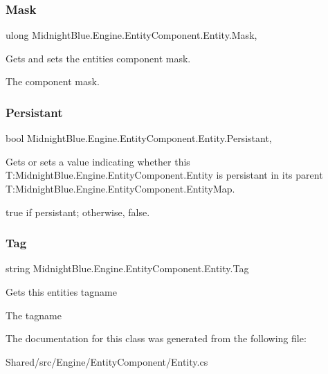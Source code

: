 \subsubsection{\texorpdfstring{Mask}{Mask}}
{\footnotesize\ttfamily ulong Midnight\+Blue.\+Engine.\+Entity\+Component.\+Entity.\+Mask\hspace{0.3cm}{\ttfamily [get]}, {\ttfamily [set]}}



Gets and sets the entities component mask. 

The component mask.\hypertarget{class_midnight_blue_1_1_engine_1_1_entity_component_1_1_entity_af8d42e94328876a35a63032ed12a54c3}{}\label{class_midnight_blue_1_1_engine_1_1_entity_component_1_1_entity_af8d42e94328876a35a63032ed12a54c3} 
\subsubsection{\texorpdfstring{Persistant}{Persistant}}
{\footnotesize\ttfamily bool Midnight\+Blue.\+Engine.\+Entity\+Component.\+Entity.\+Persistant\hspace{0.3cm}{\ttfamily [get]}, {\ttfamily [set]}}



Gets or sets a value indicating whether this T\+:\+Midnight\+Blue.\+Engine.\+Entity\+Component.\+Entity is persistant in its parent T\+:\+Midnight\+Blue.\+Engine.\+Entity\+Component.\+Entity\+Map. 

{\ttfamily true} if persistant; otherwise, {\ttfamily false}.\hypertarget{class_midnight_blue_1_1_engine_1_1_entity_component_1_1_entity_a4743d696644b924c6f74657daf2de89c}{}\label{class_midnight_blue_1_1_engine_1_1_entity_component_1_1_entity_a4743d696644b924c6f74657daf2de89c} 
\subsubsection{\texorpdfstring{Tag}{Tag}}
{\footnotesize\ttfamily string Midnight\+Blue.\+Engine.\+Entity\+Component.\+Entity.\+Tag\hspace{0.3cm}{\ttfamily [get]}}



Gets this entities tagname 

The tagname

The documentation for this class was generated from the following file\+:\begin{DoxyCompactItemize}
\item 
Shared/src/\+Engine/\+Entity\+Component/Entity.\+cs\end{DoxyCompactItemize}
